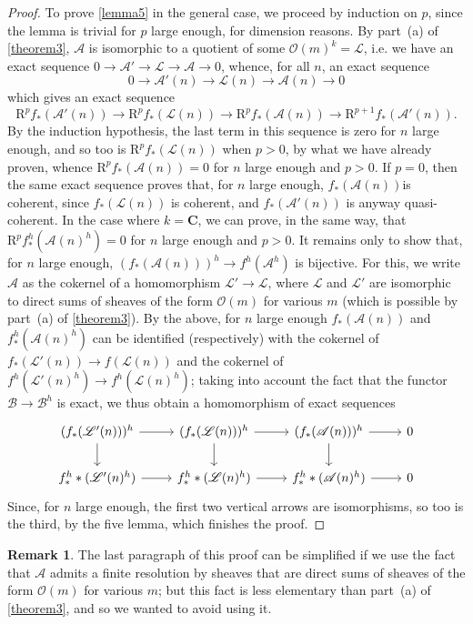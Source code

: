 \documentclass{article}
\theoremstyle{plain}
\theoremstyle{definition}
\newtheorem*{remark}{Remark}
\newcommand{\sh}{\mathscr}
\newcommand{\RR}{\mathrm{R}}
\newcommand{\oldpage}[1]{\marginpar{\footnotesize$\Big\vert$ \textit{p.~#1}}}
\begin{document}
\begin{proof}
  To prove \cref{lemma5} in the general case, we proceed by induction on $p$, since the lemma is trivial for $p$ large enough, for dimension reasons.
  By part~(a) of \cref{theorem3}, $\sh{A}$ is isomorphic to a quotient of some $\sh{O}(m)^k=\sh{L}$, i.e. we have an exact sequence $0\to\sh{A}'\to\sh{L}\to\sh{A}\to0$, whence, for all $n$, an exact sequence
  \[
    0 \to \sh{A}'(n) \to \sh{L}(n) \to \sh{A}(n) \to 0
  \]
  which gives an exact sequence
  \[
    \RR^pf_*(\sh{A}'(n))
    \to \RR^pf_*(\sh{L}(n))
    \to \RR^pf_*(\sh{A}(n))
    \to \RR^{p+1}f_*(\sh{A}'(n)).
  \]
  By the induction hypothesis, the last term in this sequence is zero for $n$ large enough, and so too is $\RR^pf_*(\sh{L}(n))$ when $p>0$, by what we have already proven, whence $\RR^pf_*(\sh{A}(n))=0$ for $n$ large enough and $p>0$.
  If $p=0$, then the same exact sequence proves that, for $n$ large enough, $f_*(\sh{A}(n))$is coherent, since $f_*(\sh{L}(n))$ is coherent, and $f_*(\sh{A}'(n))$ is anyway quasi-coherent.
  In the case where $k=\mathbf{C}$, we can prove, in the same way, that $\RR^pf_*^h(\sh{A}(n)^h)=0$ for $n$ large enough and $p>0$.
  It remains only to show that, for $n$ large enough, $(f_*(\sh{A}(n)))^h\to f^h(\sh{A}^h)$ is bijective.
  For this, we write $\sh{A}$ as the cokernel of a homomorphism $\sh{L}'\to\sh{L}$, where $\sh{L}$ and $\sh{L}'$ are isomorphic to direct sums of sheaves of the form $\sh{O}(m)$ for various $m$ (which is possible by part~(a) of \cref{theorem3}).
  By the above, for $n$ large enough $f_*(\sh{A}(n))$ and $f_*^h(\sh{A}(n)^h)$ can be identified (respectively) with the cokernel of $f_*(\sh{L}'(n))\to f(\sh{L}(n))$ and the cokernel of $f^h(\sh{L}'(n)^h)\to f^h(\sh{L}(n)^h)$;
  taking into account the fact that the functor $\sh{B}\to\sh{B}^h$ is exact, we thus obtain a homomorphism of exact sequences
  \[
    \begin{tikzcd}
      (f_*(\sh{L}'(n)))^h \ar[r] \ar[d]
      & (f_*(\sh{L}(n)))^h \ar[r] \ar[d]
      & (f_*(\sh{A}(n)))^h \ar[r] \ar[d]
      & 0
    \\f_*^h*(\sh{L}'(n)^h) \ar[r]
      & f_*^h*(\sh{L}(n)^h) \ar[r]
      & f_*^h*(\sh{A}(n)^h) \ar[r]
      & 0
    \end{tikzcd}
  \]
\oldpage{2-14}
  Since, for $n$ large enough, the first two vertical arrows are isomorphisms, so too is the third, by the five lemma, which finishes the proof.
\end{proof}

\begin{remark}
  The last paragraph of this proof can be simplified if we use the fact that $\sh{A}$ admits a finite resolution by sheaves that are direct sums of sheaves of the form $\sh{O}(m)$ for various $m$;
  but this fact is less elementary than part~(a) of \cref{theorem3}, and so we wanted to avoid using it.
\end{remark}
\end{document}
